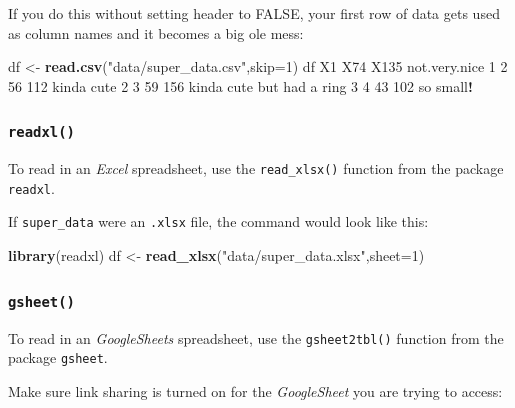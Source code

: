 \documentclass[
]{book}
\newenvironment{Shaded}{\begin{snugshade}}{\end{snugshade}}
\newcommand{\AttributeTok}[1]{\textcolor[rgb]{0.13,0.29,0.53}{#1}}
\newcommand{\DecValTok}[1]{\textcolor[rgb]{0.00,0.00,0.81}{#1}}
\newcommand{\FunctionTok}[1]{\textcolor[rgb]{0.13,0.29,0.53}{\textbf{#1}}}
\newcommand{\NormalTok}[1]{#1}
\newcommand{\OtherTok}[1]{\textcolor[rgb]{0.56,0.35,0.01}{#1}}
\newcommand{\SpecialCharTok}[1]{\textcolor[rgb]{0.81,0.36,0.00}{\textbf{#1}}}
\newcommand{\StringTok}[1]{\textcolor[rgb]{0.31,0.60,0.02}{#1}}
\begin{document}
If you do this without setting header to FALSE, your first row of data gets used as column names and it becomes a big ole mess:

\begin{Shaded}
\begin{Highlighting}[]
\NormalTok{df }\OtherTok{\textless{}{-}} \FunctionTok{read.csv}\NormalTok{(}\StringTok{"data/super\_data.csv"}\NormalTok{,}\AttributeTok{skip=}\DecValTok{1}\NormalTok{)}
\NormalTok{df}
\NormalTok{  X1 X74 X135             not.very.nice}
\DecValTok{1}  \DecValTok{2}  \DecValTok{56}  \DecValTok{112}\NormalTok{                kinda cute}
\DecValTok{2}  \DecValTok{3}  \DecValTok{59}  \DecValTok{156}\NormalTok{ kinda cute but had a ring}
\DecValTok{3}  \DecValTok{4}  \DecValTok{43}  \DecValTok{102}\NormalTok{                 so small}\SpecialCharTok{!}
\end{Highlighting}
\end{Shaded}

\subsubsection*{\texorpdfstring{\texttt{readxl()}}{readxl()}}\label{readxl}

To read in an \emph{Excel} spreadsheet, use the \texttt{read\_xlsx()} function from the package \texttt{readxl}.

If \texttt{super\_data} were an \texttt{.xlsx} file, the command would look like this:

\begin{Shaded}
\begin{Highlighting}[]
\FunctionTok{library}\NormalTok{(readxl)}
\NormalTok{df }\OtherTok{\textless{}{-}} \FunctionTok{read\_xlsx}\NormalTok{(}\StringTok{"data/super\_data.xlsx"}\NormalTok{,}\AttributeTok{sheet=}\DecValTok{1}\NormalTok{)}
\end{Highlighting}
\end{Shaded}

\subsubsection*{\texorpdfstring{\texttt{gsheet()}}{gsheet()}}\label{gsheet}

To read in an \emph{GoogleSheets} spreadsheet, use the \texttt{gsheet2tbl()} function from the package \texttt{gsheet}.

Make sure link sharing is turned on for the \emph{GoogleSheet} you are trying to access:
\end{document}
